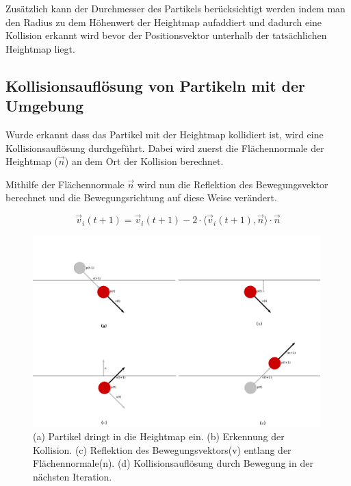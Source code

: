 \begin{Spacing}{\mylinespace}
    	Zusätzlich kann der Durchmesser des Partikels berücksichtigt werden
    	indem man den Radius zu dem Höhenwert der Heightmap aufaddiert und
    	dadurch eine Kollision erkannt wird bevor der Positionsvektor unterhalb
    	der tatsächlichen Heightmap liegt.

    \subsection{Kollisionsauflösung von Partikeln mit der Umgebung}
    	Wurde erkannt dass das Partikel mit der Heightmap kollidiert ist, wird eine
    	Kollisionsauflösung durchgeführt. Dabei wird zuerst die Flächennormale
    	der Heightmap ($\vec{n}$) an dem Ort der Kollision berechnet.


    	Mithilfe der Flächennormale $\vec{n}$ wird nun die Reflektion des Bewegungsvektor
    	berechnet und die Bewegungsrichtung auf diese Weise verändert.

    	\[ \vec{v}_{i}(t+1) = \vec{v}_{i}(t+1) -2 \cdot \langle \vec{v}_{i}(t+1) , \vec{n} \rangle \cdot \vec{n} \]

		\begin{figure}[h!]
			\includegraphics[width=0.99\textwidth]{graphics/Phys_kh1234.png}
			\caption{(a) Partikel dringt in die Heightmap ein. (b) Erkennung der Kollision. (c) Reflektion des Bewegungsvektors(v) entlang der Flächennormale(n). (d) Kollisionsauflösung durch Bewegung in der nächsten Iteration. }
			\label{fig:reflexHeihtmap}
		\end{figure}


\end{Spacing}

